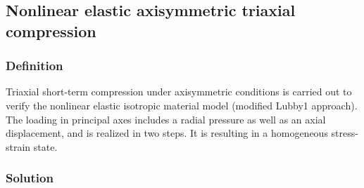 \subsection{Nonlinear elastic axisymmetric triaxial compression}
\label{subsec:Me6}

\subsubsection{Definition}
\label{subsubsec:Me6_def}

Triaxial short-term compression under axisymmetric conditions is carried out to verify the nonlinear elastic isotropic material model (modified Lubby1 approach). The loading in principal axes includes a radial pressure as well as an axial displacement, and is realized in two steps. It is resulting in a homogeneous stress-strain state. 

\subsubsection{Solution}
\label{subsubsec:Me6_sol}

